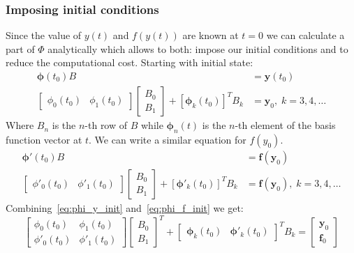 \documentclass{article}
\begin{document}
    \subsubsection{Imposing initial conditions}
    Since the value of $y(t)$ and $f(y(t))$ are known at $t=0$ we can calculate a part of $\Phi$ analytically which
    allows to both: impose our initial conditions and to reduce the computational cost.
    Starting with initial state:
    \begin{align}
        \label{eq:phi_y_init}
        \pmb{\phi}(t_0) B &= \pmb{y}(t_0) \\
        \begin{bmatrix}
            \phi_0(t_0) &
            \phi_1(t_0)
        \end{bmatrix}
        \begin{bmatrix}
            B_0 \\
            B_1
        \end{bmatrix}
        +
        \left[ \pmb{\phi}_k(t_0) \right]^T B_k
        &= \pmb{y}_0, \; k=3,4,\dots
    \end{align}
    Where $B_n$ is the $n$-th row of $B$ while $\pmb{\phi}_n(t)$ is the $n$-th element of the basis function vector at
    $t$.
    We can write a similar equation for $f(y_0)$.
    \begin{align}
        \label{eq:phi_f_init}
        \pmb{\phi}'(t_0) B &= \pmb{f}(\pmb{y}_0) \\
        \begin{bmatrix}
            \phi'_0(t_0) &
            \phi'_1(t_0)
        \end{bmatrix}
        \begin{bmatrix}
            B_0 \\
            B_1
        \end{bmatrix}
        +
        \left[ \pmb{\phi}'_k(t_0) \right]^T B_k
        &= \pmb{f}(\pmb{y}_0), \; k=3,4,\dots
    \end{align}
    Combining~\eqref{eq:phi_y_init} and~\eqref{eq:phi_f_init} we get:
    \begin{equation}
        \label{eq:init_cond}
        \begin{bmatrix}
            \phi_0(t_0)  & \phi_1(t_0)  \\
            \phi'_0(t_0) & \phi'_1(t_0)
        \end{bmatrix}
        \begin{bmatrix}
            B_0 \\ B_1
        \end{bmatrix}^T
        +
        \begin{bmatrix}
            \pmb{\phi}_k(t_0) &
            \pmb{\phi}'_k(t_0)
        \end{bmatrix}^T
        B_k
        =
        \begin{bmatrix}
            \pmb{y}_0 \\
            \pmb{f}_0
        \end{bmatrix}
    \end{equation}
\end{document}
